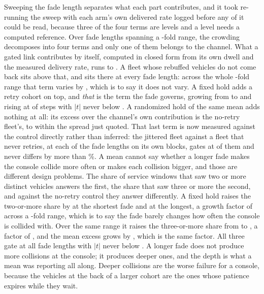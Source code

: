 \documentclass[11pt]{article}
\begin{document}
Sweeping the fade length separates what each part contributes, and it took re-running the sweep with each arm's own delivered rate logged before any of it could be read, because three of the four terms are levels and a level needs a computed reference. Over \dwN{} fade lengths spanning a \dwFold{}-fold range, the crowding decomposes into four terms and only one of them belongs to the channel. What a gated link contributes by itself, computed in closed form from its own dwell and the measured delivery rate, runs \dwNullLo{} to \dwNullHi{}. A fleet whose rebuffed vehicles do not come back sits \dwJitMean{} above that, and sits there at every fade length: across the whole \dwFold{}-fold range that term varies by \dwJitSpread{}, which is to say it does not vary. A fixed hold adds a retry cohort on top, and \emph{that} is the term the fade governs, growing from \dwGapLo{} to \dwGapHi{} and rising at \dwGapRising{} of \dwGapSteps{} steps with $|t|$ never below \dwGapMinT{}. A randomized hold of the same mean adds nothing at all: its excess over the channel's own contribution is the no-retry fleet's, to within the spread just quoted. That last term is now measured against the control directly rather than inferred: the jittered fleet against a fleet that never retries, at each of the \tlDwells{} fade lengths on its own blocks, gates at \tlJitGated{} of them and never differs by more than \tlJitMaxPct{}\%.
A mean cannot say whether a longer fade makes the console collide more often or makes each collision bigger, and those are different design problems. The share of service windows that saw two or more distinct vehicles answers the first, the share that saw three or more the second, and against the no-retry control they answer differently. A fixed hold raises the two-or-more share by \tlGeTwoLo{} at the shortest fade and \tlGeTwoHi{} at the longest, a growth factor of \tlGeTwoGrowth{} across a \tlFold{}-fold range, which is to say the fade barely changes how often the console is collided with. Over the same range it raises the three-or-more share from \tlGeThreeLo{} to \tlGeThreeHi{}, a factor of \tlGeThreeGrowth{}, and the mean excess grows by \tlExcGrowth{}, which is the same factor. All three gate at all \tlDwells{} fade lengths with $|t|$ never below \tlGeTwoMinT{}. A longer fade does not produce more collisions at the console; it produces deeper ones, and the depth is what a mean was reporting all along. Deeper collisions are the worse failure for a console, because the vehicles at the back of a larger cohort are the ones whose patience expires while they wait.
\end{document}

